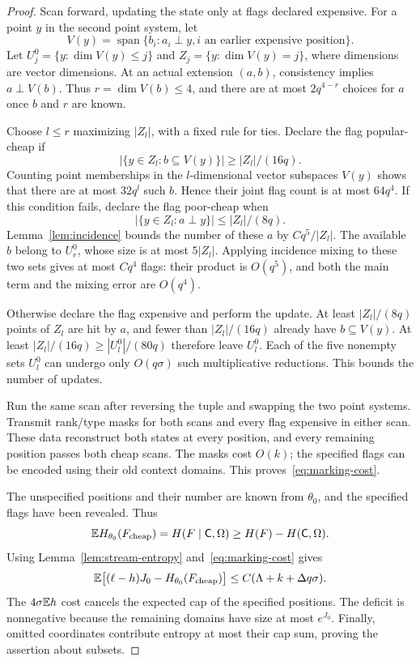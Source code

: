 \begin{proof}
Scan forward, updating the state only at flags declared expensive.
For a point $y$ in the second point system, let
\[
 V(y)=\operatorname{span}\{b_i:a_i\perp y, i
       \text{ an earlier expensive position}\}.
\]
Let $U_j^0=\{y:\dim V(y)\le j\}$ and
$Z_j=\{y:\dim V(y)=j\}$, where dimensions are vector dimensions.
At an actual extension $(a,b)$, consistency implies $a\perp V(b)$.
Thus $r=\dim V(b)\le4$, and there are at most $2q^{4-r}$ choices for
$a$ once $b$ and $r$ are known.

Choose $l\le r$ maximizing $|Z_l|$, with a fixed rule for ties.  Declare
the flag popular-cheap if
\[
 |\{y\in Z_l:b\subseteq V(y)\}|\ge |Z_l|/(16q).
\]
Counting point memberships in the $l$-dimensional vector subspaces
$V(y)$ shows that there are at most $32q^l$ such $b$.  Hence their joint
flag count is at most $64q^4$.  If this condition fails, declare the flag
poor-cheap when
\[
 |\{y\in Z_l:a\perp y\}|\le |Z_l|/(8q).
\]
Lemma~\ref{lem:incidence} bounds the number of these $a$ by
$Cq^5/|Z_l|$.  The available $b$ belong to $U_r^0$, whose size is at
most $5|Z_l|$.  Applying incidence mixing to these two sets gives at most
$Cq^4$ flags: their product is $O(q^5)$, and both the main term and the
mixing error are $O(q^4)$.

Otherwise declare the flag expensive and perform the update.
At least $|Z_l|/(8q)$ points of $Z_l$ are hit by $a$, and fewer than
$|Z_l|/(16q)$ already have $b\subseteq V(y)$.  At least
$|Z_l|/(16q)\ge |U_l^0|/(80q)$ therefore leave $U_l^0$.
Each of the five nonempty sets $U_l^0$ can undergo only $O(q\sigma)$
such multiplicative reductions.  This bounds the number of updates.

Run the same scan after reversing the tuple and swapping the two point
systems.  Transmit rank/type masks for both scans and every flag
expensive in either scan.  These data reconstruct both states at every
position, and every remaining position passes both cheap scans.
The masks cost $O(k)$; the specified flags can be encoded using their
old context domains.  This proves~\eqref{eq:marking-cost}.

The unspecified positions and their number are known from $\theta_0$,
and the specified flags have been revealed. Thus
\[
 \mathbb E H_{\theta_0}(F_{\rm cheap})
 =H(F\mid\mathsf C,\Omega)\ge H(F)-H(\mathsf C,\Omega).
\]
Using Lemma~\ref{lem:stream-entropy} and~\eqref{eq:marking-cost} gives
\[
 \mathbb E\bigl[(\ell-h)J_0-H_{\theta_0}(F_{\rm cheap})\bigr]
 \le C(\Lambda+k+\Delta q\sigma).
\]
The $4\sigma\mathbb E h$ cost cancels the expected cap of the specified positions.
The deficit is nonnegative because the remaining domains have size at
most $e^{J_0}$.  Finally, omitted coordinates contribute entropy at most
their cap sum, proving the assertion about subsets.
\end{proof}

